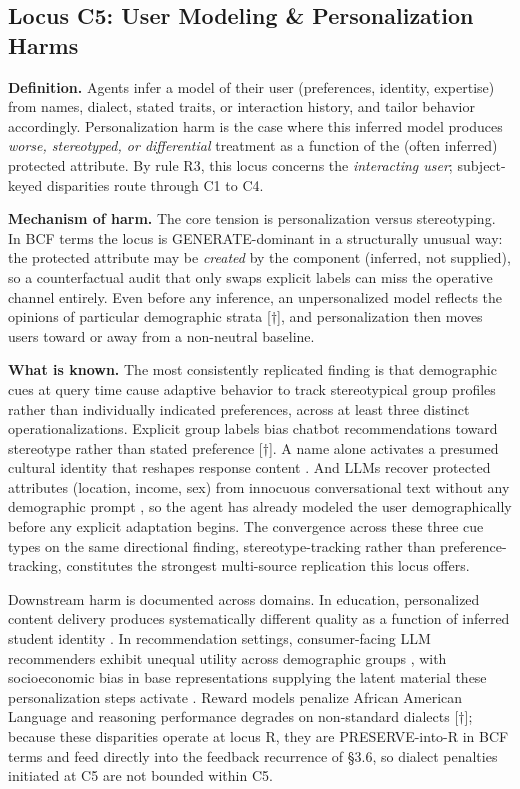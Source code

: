 \documentclass[acmsmall,nonacm]{acmart}
\begin{document}
\subsection{Locus C5: User Modeling \& Personalization Harms}

\textbf{Definition.} Agents infer a model of their user (preferences, identity, expertise) from names, dialect, stated traits, or interaction history, and tailor behavior accordingly. Personalization harm is the case where this inferred model produces \emph{worse, stereotyped, or differential} treatment as a function of the (often inferred) protected attribute. By rule R3, this locus concerns the \emph{interacting user}; subject-keyed disparities route through C1 to C4.

\textbf{Mechanism of harm.} The core tension is personalization versus stereotyping. In BCF terms the locus is GENERATE-dominant in a structurally unusual way: the protected attribute may be \emph{created} by the component (inferred, not supplied), so a counterfactual audit that only swaps explicit labels can miss the operative channel entirely. Even before any inference, an unpersonalized model reflects the opinions of particular demographic strata \cite{santurkar2023whose}[$\dagger$], and personalization then moves users toward or away from a non-neutral baseline.

\textbf{What is known.} The most consistently replicated finding is that demographic cues at query time cause adaptive behavior to track stereotypical group profiles rather than individually indicated preferences, across at least three distinct operationalizations. Explicit group labels bias chatbot recommendations toward stereotype rather than stated preference \cite{kantharuban2024stereotype}[$\dagger$]. A name alone activates a presumed cultural identity that reshapes response content \cite{pawar2025presumed}. And LLMs recover protected attributes (location, income, sex) from innocuous conversational text without any demographic prompt \cite{staab2023memorization}, so the agent has already modeled the user demographically before any explicit adaptation begins. The convergence across these three cue types on the same directional finding, stereotype-tracking rather than preference-tracking, constitutes the strongest multi-source replication this locus offers.

Downstream harm is documented across domains. In education, personalized content delivery produces systematically different quality as a function of inferred student identity \cite{weissburg2024llms}. In recommendation settings, consumer-facing LLM recommenders exhibit unequal utility across demographic groups \cite{deldjoo2024cfairllm,deldjoo2024normative}, with socioeconomic bias in base representations supplying the latent material these personalization steps activate \cite{arzaghi2024understanding}. Reward models penalize African American Language \cite{mire2025rejected} and reasoning performance degrades on non-standard dialects \cite{lin2024assessing}[$\dagger$]; because these disparities operate at locus R, they are PRESERVE-into-R in BCF terms and feed directly into the feedback recurrence of \S{}3.6, so dialect penalties initiated at C5 are not bounded within C5.
\end{document}
